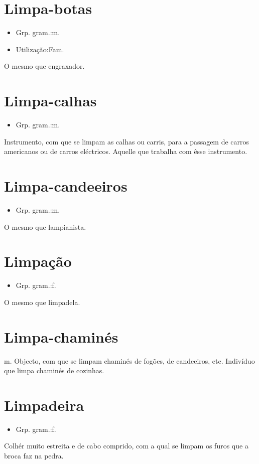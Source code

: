 \section{Limpa-botas}
\begin{itemize}
\item {Grp. gram.:m.}
\end{itemize}
\begin{itemize}
\item {Utilização:Fam.}
\end{itemize}
O mesmo que \textunderscore engraxador\textunderscore .
\section{Limpa-calhas}
\begin{itemize}
\item {Grp. gram.:m.}
\end{itemize}
Instrumento, com que se limpam as calhas ou carris, para a passagem de carros americanos ou de carros eléctricos.
Aquelle que trabalha com êsse instrumento.
\section{Limpa-candeeiros}
\begin{itemize}
\item {Grp. gram.:m.}
\end{itemize}
O mesmo que \textunderscore lampianista\textunderscore .
\section{Limpação}
\begin{itemize}
\item {Grp. gram.:f.}
\end{itemize}
O mesmo que \textunderscore limpadela\textunderscore .
\section{Limpa-chaminés}
\textunderscore m.\textunderscore 
Objecto, com que se limpam chaminés de fogões, de candeeiros, etc.
Indivíduo que limpa chaminés de cozinhas.
\section{Limpadeira}
\begin{itemize}
\item {Grp. gram.:f.}
\end{itemize}
Colhér muito estreita e de cabo comprido, com a qual se limpam os furos que a broca faz na pedra.
